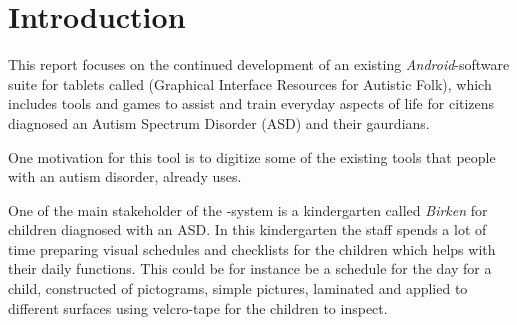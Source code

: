 \chapter{Introduction}
\label{cha:introduction}


This report focuses on the continued development of an existing \emph{Android}-software suite for tablets called \giraf(Graphical Interface Resources for Autistic Folk), which includes tools and games to assist and train everyday aspects of life for citizens diagnosed an Autism Spectrum Disorder (ASD) and their gaurdians. 

One motivation for this tool is to digitize some of the existing tools that people with an autism disorder, already uses. 

One of the main stakeholder of the \giraf-system is a kindergarten called \emph{Birken} for children diagnosed with an ASD. In this kindergarten the staff spends a lot of time preparing visual schedules and checklists for the children which helps with their daily functions. 
This could be for instance be a schedule for the day for a child, constructed of pictograms, simple pictures, laminated and applied to different surfaces using velcro-tape for the children to inspect.




